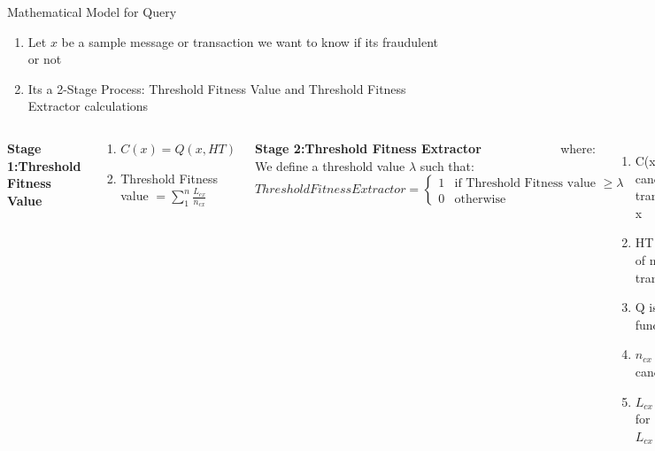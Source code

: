 \documentclass[11pt,aspectratio=169]{beamer}
\begin{document}
	\begin{frame}{ \small{Mathematical Model for Query}}
		\begin{enumerate}[1)]
			\item Let \textbf{$x$} be a sample message or transaction we want to know if its fraudulent or not
			\item Its a 2-Stage Process: Threshold Fitness Value and Threshold Fitness Extractor calculations
		\end{enumerate}
		
		\begin{columns}
			\small{
		\textbf{Stage 1:Threshold Fitness Value}
		\begin{center}
			\begin{enumerate}[-]
			\item $C(x)=Q(x,HT)$\\
			\item Threshold Fitness value	$ = \sum_1^n \frac{L_{cx}}{n_{cx}}$\\
		\end{enumerate}
		\end{center}
		\textbf{Stage 2:Threshold Fitness Extractor}\\
			We define a threshold value  $\lambda$ such that:\\
		\tiny{
			\begin{equation}
				Threshold Fitness Extractor =
				\begin{cases}
					1 & \text{if Threshold Fitness value $\geq \lambda$} \\
					0 & \text{otherwise}
				\end{cases}
			\end{equation}
		}
	}
			where:\\
			\begin{enumerate}[-]
				\item C(x) are the candidates of transaction/message x 
				\item HT is a hash table of messages or transactions 
				\item  Q is the Query function
				\item  $n_{cx}$ is the number of candidates of x. 
				\item $L_{cx}$ are the labels for C(x)  ,$L_{cx}  \in [0,1]$ 
			\end{enumerate}
		\end{columns}
 	\end{frame}
	
\end{document}
